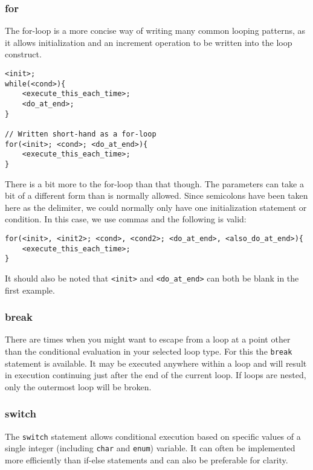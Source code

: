 \documentclass[10pt]{article}
\begin{document}
\subsubsection*{for}
The for-loop is a more concise way of writing many common looping patterns, as it allows initialization and an increment operation to be written into the loop construct.

\begin{lstlisting}[label=lst-for-loop,caption=Generic for-loop]
<init>;
while(<cond>){
	<execute_this_each_time>;
	<do_at_end>;
}

// Written short-hand as a for-loop
for(<init>; <cond>; <do_at_end>){
	<execute_this_each_time>;
}
\end{lstlisting}

There is a bit more to the for-loop than that though. The parameters can take a bit of a different form than is normally allowed. Since semicolons have been taken here as the delimiter, we could normally only have one initialization statement or condition. In this case, we use commas and the following is valid:

\begin{lstlisting}[label=lst-complex-for-loop,caption=More complex for-loop]
for(<init>, <init2>; <cond>, <cond2>; <do_at_end>, <also_do_at_end>){
	<execute_this_each_time>;
}
\end{lstlisting}

It should also be noted that \texttt{<init>} and \texttt{<do\_at\_end>} can both be blank in the first example.

\subsubsection*{break}
There are times when you might want to escape from a loop at a point other than the conditional evaluation in your selected loop type. For this the \texttt{break} statement is available. It may be executed anywhere within a loop and will result in execution continuing just after the end of the current loop. If loops are nested, only the outermost loop will be broken.

\subsubsection*{switch}
The \texttt{switch} statement allows conditional execution based on specific values of a single integer (including \texttt{char} and \texttt{enum}) variable. It can often be implemented more efficiently than if-else statements and can also be preferable for clarity. \\
\end{document}
